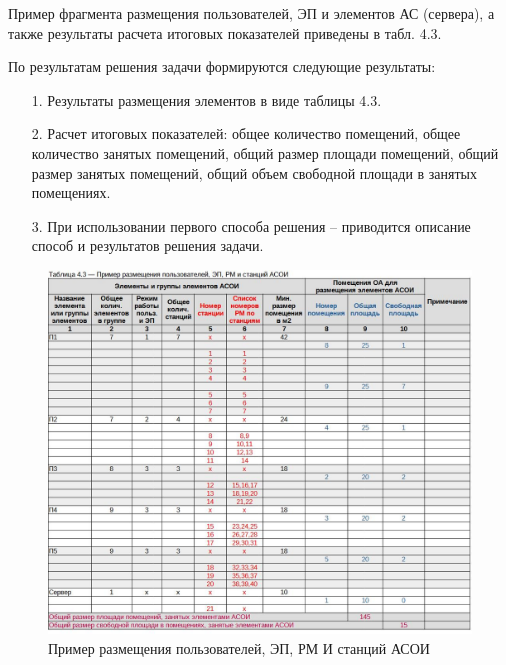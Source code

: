 \documentclass[12pt, a4paper, simple]{eskdtext}
\begin{document}
    Пример фрагмента размещения пользователей, ЭП и элементов АС (сервера),
    а также ре­зультаты расчета итоговых показателей приведены в табл. 4.3.

    По результатам решения задачи формируются следующие результаты:
    \begin{enumerate}
        \item[1.] Результаты размещения элементов в виде таблицы 4.3.
        \item[2.] Расчет итоговых показателей: общее количество помещений,
        общее количество занятых помеще­ний, общий размер площади помещений,
        общий размер занятых помещений, общий объем свободной площади в занятых помещениях.
        \item[3.] При использовании первого способа решения – приводится описание способ и результатов реше­ния задачи.
    \end{enumerate}

    \begin{figure}[ht!]
        \centering
        \includegraphics[width=14cm]
            {_docs/Таблица4-3ПримерРазмещенияПользователейЭПРМИСтанцийАСОИ.jpg}
        \caption{Пример размещения пользователей, ЭП, РМ И станций АСОИ}
    \end{figure}
\end{document}
